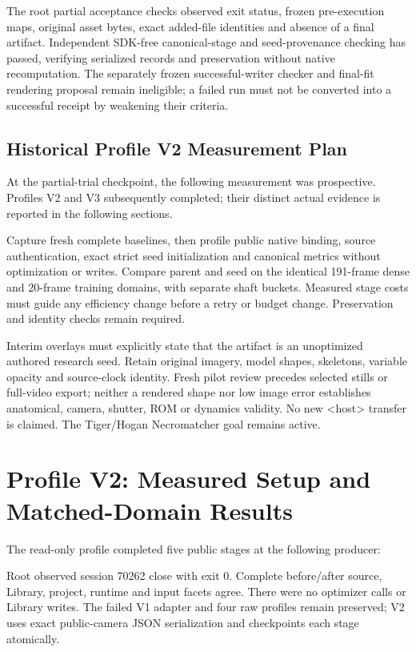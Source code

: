 \documentclass[11pt]{article}
\newcommand{\digest}[1]{\texttt{\small\detokenize{#1}}}
\begin{document}
The root partial acceptance checks observed exit status, frozen pre-execution maps, original asset bytes, exact added-file identities and absence of a final artifact. Independent SDK-free canonical-stage and seed-provenance checking has passed, verifying serialized records and preservation without native recomputation. The separately frozen successful-writer checker and final-fit rendering proposal remain ineligible; a failed run must not be converted into a successful receipt by weakening their criteria.

\subsection*{Historical Profile V2 Measurement Plan}
At the partial-trial checkpoint, the following measurement was prospective.
Profiles V2 and V3 subsequently completed; their distinct actual evidence is
reported in the following sections.

Capture fresh complete baselines, then profile public native binding, source authentication, exact strict seed initialization and canonical metrics without optimization or writes. Compare parent and seed on the identical 191-frame dense and 20-frame training domains, with separate shaft buckets. Measured stage costs must guide any efficiency change before a retry or budget change. Preservation and identity checks remain required.

Interim overlays must explicitly state that the artifact is an unoptimized authored research seed. Retain original imagery, model shapes, skeletons, variable opacity and source-clock identity. Fresh pilot review precedes selected stills or full-video export; neither a rendered shape nor low image error establishes anatomical, camera, shutter, ROM or dynamics validity. No new <host> transfer is claimed. The Tiger/Hogan Necromatcher goal remains active.
\newpage
\section*{Profile V2: Measured Setup and Matched-Domain Results}
The read-only profile completed five public stages at the following producer:
\begin{center}\digest{0143b39f571cbe67c57091fb2ae19e7d7eadae3b}\end{center} Root observed session 70262 close with exit 0. Complete before/after source, Library, project, runtime and input facets agree. There were no optimizer calls or Library writes. The failed V1 adapter and four raw profiles remain preserved; V2 uses exact public-camera JSON serialization and checkpoints each stage atomically.
\end{document}
